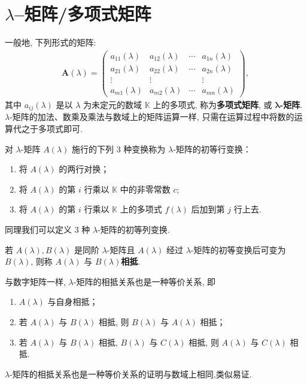 \documentclass[../../main.tex]{subfiles}
\begin{document}
\section{$\lambda$--矩阵/多项式矩阵}

\begin{definition}[$\lambda$-矩阵]
一般地, 下列形式的矩阵:
\begin{align*}
\boldsymbol{A}(\lambda)=
\begin{pmatrix}
a_{11}(\lambda) & a_{12}(\lambda) & \cdots & a_{1n}(\lambda) \\
a_{21}(\lambda) & a_{22}(\lambda) & \cdots & a_{2n}(\lambda) \\
\vdots & \vdots & & \vdots \\
a_{m1}(\lambda) & a_{m2}(\lambda) & \cdots & a_{mn}(\lambda)
\end{pmatrix},
\end{align*}
其中 $a_{ij}(\lambda)$ 是以 $\lambda$ 为未定元的数域 $\mathbb{K}$ 上的多项式, 称为\textbf{多项式矩阵}, 或 $\boldsymbol{\lambda}$\textbf{-矩阵}. $\lambda$-矩阵的加法、数乘及乘法与数域上的矩阵运算一样, 只需在运算过程中将数的运算代之于多项式即可.
\end{definition}

\begin{definition}
对 $\lambda$-矩阵 $A(\lambda)$ 施行的下列 3 种变换称为 $\lambda$-矩阵的初等行变换：
\begin{enumerate}[(1)]
\item 将 $A(\lambda)$ 的两行对换；

\item 将 $A(\lambda)$ 的第 $i$ 行乘以 $\mathbb{K}$ 中的非零常数 $c$;

\item 将 $A(\lambda)$ 的第 $i$ 行乘以 $\mathbb{K}$ 上的多项式 $f(\lambda)$ 后加到第 $j$ 行上去.
\end{enumerate}

同理我们可以定义 3 种 $\lambda$-矩阵的初等列变换.
\end{definition}

\begin{definition}
若 $A(\lambda),B(\lambda)$ 是同阶 $\lambda$-矩阵且 $A(\lambda)$ 经过 $\lambda$-矩阵的初等变换后可变为 $B(\lambda)$, 则称 $A(\lambda)$ 与 $B(\lambda)$\textbf{相抵}.

与数字矩阵一样, $\lambda$-矩阵的相抵关系也是一种等价关系, 即
\begin{enumerate}[(1)]
\item $A(\lambda)$ 与自身相抵；

\item 若 $A(\lambda)$ 与 $B(\lambda)$ 相抵, 则 $B(\lambda)$ 与 $A(\lambda)$ 相抵；

\item 若 $A(\lambda)$ 与 $B(\lambda)$ 相抵, $B(\lambda)$ 与 $C(\lambda)$ 相抵, 则 $A(\lambda)$ 与 $C(\lambda)$ 相抵.
\end{enumerate}
\end{definition}
\begin{note}
$\lambda$-矩阵的相抵关系也是一种等价关系的证明与数域上相同,类似易证.
\end{note}
\end{document}
